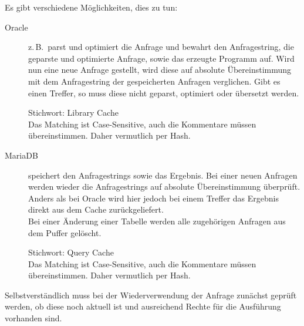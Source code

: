 \begin{enumerate}[a)]
	\begin{solution}
	Es gibt verschiedene Möglichkeiten, dies zu tun:

\begin{description}
\item[Oracle] z.\,B.\ parst und optimiert die Anfrage und bewahrt den Anfragestring, die geparste und optimierte Anfrage, sowie das erzeugte Programm auf.
Wird nun eine neue Anfrage gestellt, wird diese auf absolute Übereinstimmung mit dem Anfragestring der gespeicherten Anfragen verglichen.
Gibt es einen Treffer, so muss diese nicht geparst, optimiert oder übersetzt werden.

\begin{note}
Stichwort: Library Cache\\
Das Matching ist Case-Sensitive, auch die Kommentare müssen übereinstimmen.
Daher vermutlich per Hash.
\end{note}

\item[MariaDB] speichert den Anfragestrings sowie das Ergebnis.
Bei einer neuen Anfragen werden wieder die Anfragestrings auf absolute Übereinstimmung überprüft.
Anders als bei Oracle wird hier jedoch bei einem Treffer das Ergebnis direkt aus dem Cache zurückgeliefert.\\
Bei einer Änderung einer Tabelle werden alle zugehörigen Anfragen aus dem Puffer gelöscht.

\begin{note}
Stichwort: Query Cache\\
Das Matching ist Case-Sensitive, auch die Kommentare müssen übereinstimmen.
Daher vermutlich per Hash.
\end{note}
\end{description}

Selbstverständlich muss bei der Wiederverwendung der Anfrage zunächst geprüft werden, ob diese noch aktuell ist und ausreichend Rechte für die Ausführung vorhanden sind.
\end{solution}

\end{enumerate}
